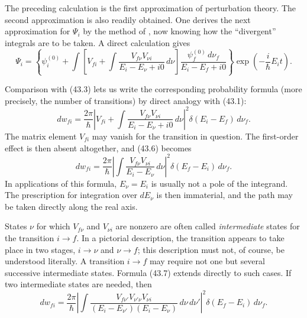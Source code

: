 The preceding calculation is the first approximation of perturbation theory.
The second approximation is also readily obtained. One derives the next
approximation for $\Psi_i$ by the method of , now knowing how the
``divergent'' integrals are to be taken. A direct calculation gives
\[
  \Psi_i=\left\{\psi_i^{(0)}+\int\left[
  V_{fi}+\int\frac{V_{f\nu}V_{\nu i}}{E_i-E_\nu+i0}\,d\nu
  \right]\frac{\psi_f^{(0)}\,d\nu_f}{E_i-E_f+i0}\right\}
  \exp\left(-\frac{i}{\hbar}E_it\right).
\]

Comparison with (43.3) lets us write the corresponding probability formula
(more precisely, the number of transitions) by direct analogy with (43.1):
\begin{equation}
  dw_{fi}=\frac{2\pi}{\hbar}
  \left|V_{fi}+\int\frac{V_{f\nu}V_{\nu i}}
  {E_i-E_\nu+i0}\,d\nu\right|^2
  \delta(E_i-E_f)\,d\nu_f.
  \tag{43.6}
\end{equation}
The matrix element $V_{fi}$ may vanish for the transition in question. The
first-order effect is then absent altogether, and (43.6) becomes
\begin{equation}
  dw_{fi}=\frac{2\pi}{\hbar}
  \left|\int\frac{V_{f\nu}V_{\nu i}}{E_i-E_\nu}\,d\nu\right|^2
  \delta(E_f-E_i)\,d\nu_f.
  \tag{43.7}
\end{equation}
In applications of this formula, $E_\nu=E_i$ is usually not a pole of the
integrand. The prescription for integration over $dE_\nu$ is then immaterial,
and the path may be taken directly along the real axis.

States $\nu$ for which $V_{f\nu}$ and $V_{\nu i}$ are nonzero are often
called \emph{intermediate} states for the transition $i\to f$. In a pictorial
description, the transition appears to take place in two stages,
$i\to\nu$ and $\nu\to f$; this description must not, of course, be understood
literally. A transition $i\to f$ may require not one but several successive
intermediate states. Formula (43.7)
extends directly to such cases. If two intermediate states are needed, then
\begin{equation}
  dw_{fi}=\frac{2\pi}{\hbar}
  \left|\int\frac{V_{f\nu'}V_{\nu'\nu}V_{\nu i}}
  {(E_i-E_{\nu'})(E_i-E_\nu)}\,d\nu\,d\nu'\right|^2
  \delta(E_f-E_i)\,d\nu_f.
  \tag{43.8}
\end{equation}


